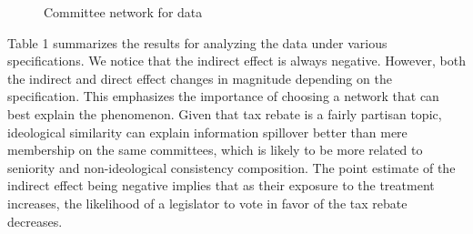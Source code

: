 \documentclass[12pt]{article}
\begin{document}
\begin{figure}
\begin{tabular}{cc}
	\end{tabular}
	\caption{Committee network for  \citet{butler2011can} data}
\end{figure}


Table 1 summarizes the results for analyzing the \citet{butler2011can} data under various specifications. We notice that the indirect effect is always negative. However, both the indirect and direct effect changes in magnitude depending on the specification. This emphasizes the importance of choosing a network that can best explain the phenomenon. Given that tax rebate is a fairly partisan topic, ideological similarity can explain information spillover better than mere membership on the same committees, which is likely to be more related to seniority and non-ideological consistency composition. The point estimate of the indirect effect being negative implies that as their exposure to the treatment increases, the likelihood of a legislator to vote in favor of the tax rebate decreases.

\end{document}
